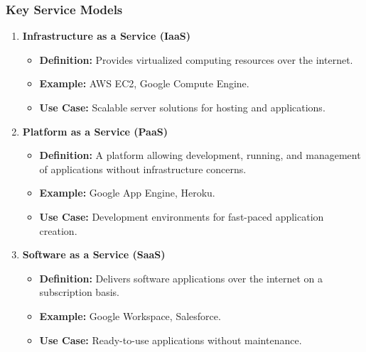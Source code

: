 \documentclass[aspectratio=169]{beamer}
\begin{document}
\begin{frame}[fragile]
    \frametitle{Key Service Models}
    \begin{enumerate}
        \item \textbf{Infrastructure as a Service (IaaS)}
            \begin{itemize}
                \item \textbf{Definition:} Provides virtualized computing resources over the internet.
                \item \textbf{Example:} AWS EC2, Google Compute Engine.
                \item \textbf{Use Case:} Scalable server solutions for hosting and applications.
            \end{itemize}
        
        \item \textbf{Platform as a Service (PaaS)}
            \begin{itemize}
                \item \textbf{Definition:} A platform allowing development, running, and management of applications without infrastructure concerns.
                \item \textbf{Example:} Google App Engine, Heroku.
                \item \textbf{Use Case:} Development environments for fast-paced application creation.
            \end{itemize}
        
        \item \textbf{Software as a Service (SaaS)}
            \begin{itemize}
                \item \textbf{Definition:} Delivers software applications over the internet on a subscription basis.
                \item \textbf{Example:} Google Workspace, Salesforce.
                \item \textbf{Use Case:} Ready-to-use applications without maintenance.
            \end{itemize}
    \end{enumerate}
\end{frame}
\end{document}
